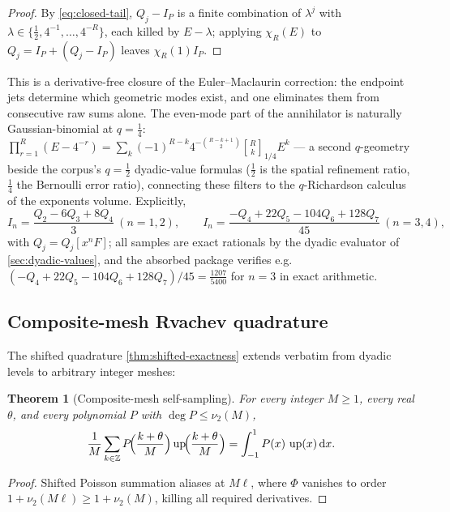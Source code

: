 \documentclass[11pt,oneside]{article}
\numberwithin{equation}{section}
\newtheorem{theorem}{Theorem}[section]
\theoremstyle{definition}
\theoremstyle{remark}
\newcommand{\Z}{\mathbb Z}
\newcommand{\dd}{\,\mathrm d}
\newcommand{\Up}{\operatorname{up}}
\newcommand{\vtwo}{\nu_2}
\begin{document}
\begin{proof}
By \eqref{eq:closed-tail}, $Q_j-I_P$ is a finite combination of
$\lambda^{j}$ with
$\lambda\in\{\tfrac12,4^{-1},\ldots,4^{-R}\}$, each killed by
$E-\lambda$; applying $\chi_R(E)$ to $Q_j=I_P+(Q_j-I_P)$ leaves
$\chi_R(1)I_P$.
\end{proof}

This is a derivative-free closure of the Euler--Maclaurin correction:
the endpoint jets determine which geometric modes exist, and one
eliminates them from consecutive raw sums alone.  The even-mode part
of the annihilator is naturally Gaussian-binomial at $q=\tfrac14$:
$\prod_{r=1}^{R}(E-4^{-r})
=\sum_{k}(-1)^{R-k}4^{-\binom{R-k+1}2}
\genfrac{[}{]}{0pt}{}{R}{k}_{1/4}E^{k}$ --- a second $q$-geometry
beside the corpus's $q=\tfrac12$ dyadic-value formulas ($\tfrac12$ is
the spatial refinement ratio, $\tfrac14$ the Bernoulli error ratio),
connecting these filters to the $q$-Richardson calculus of the
exponents volume.  Explicitly,
\begin{equation}
 I_n=\frac{Q_2-6Q_3+8Q_4}{3}\ (n=1,2),
 \qquad
 I_n=\frac{-Q_4+22Q_5-104Q_6+128Q_7}{45}\ (n=3,4),
 \label{eq:richardson-explicit}
\end{equation}
with $Q_j=Q_j[x^{n}F]$; all samples are exact rationals by the dyadic
evaluator of \cref{sec:dyadic-values}, and the absorbed package
verifies e.g.\ $(-Q_4+22Q_5-104Q_6+128Q_7)/45=\tfrac{1207}{5400}$ for
$n=3$ in exact arithmetic.

\subsection{Composite-mesh Rvachev quadrature}

The shifted quadrature \cref{thm:shifted-exactness} extends verbatim
from dyadic levels to arbitrary integer meshes:

\begin{theorem}[Composite-mesh self-sampling]
\label{thm:up-composite-mesh}
For every integer $M\ge1$, every real $\theta$, and every polynomial
$P$ with $\deg P\le\vtwo(M)$,
\begin{equation}
 \frac1M\sum_{k\in\Z}
 P\!\Bigl(\frac{k+\theta}{M}\Bigr)
 \Up\!\Bigl(\frac{k+\theta}{M}\Bigr)
 =\int_{-1}^{1}P(x)\,\Up(x)\dd x.
 \label{eq:up-composite-mesh}
\end{equation}
\end{theorem}

\begin{proof}
Shifted Poisson summation aliases at $M\ell$, where $\Phi$ vanishes to
order $1+\vtwo(M\ell)\ge1+\vtwo(M)$, killing all required derivatives.
\end{proof}
\end{document}
